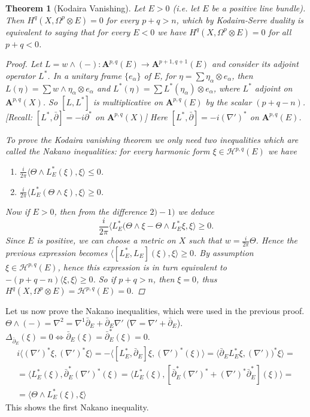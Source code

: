 \documentclass[12pt]{article}
\theoremstyle{darkgreentheorem}
\newtheorem{thm}{Theorem}[section]
\theoremstyle{darkbluedefinition}
\theoremstyle{darkredexample}
\theoremstyle{remark}
\newcommand{\1}{\mathbbm{1}}
\newcommand{\A}{\mathbf{A}}
\renewcommand{\H}{\mathcal{H}}
\newcommand{\ot}{\otimes}
\begin{document}
\begin{thm}[Kodaira Vanishing]
    Let $E>0$ (i.e. let $E$ be a positive line bundle).
    Then $H^{q}(X,\Omega^{p}\ot E)=0$ for every $p+q>n$, which by Kodaira-Serre duality is equivalent to saying that for every $E<0$ we have $H^{q}(X,\Omega^{p}\ot E)=0$ for all $p+q<0$.
    \begin{proof}
	Let $L=w\wedge (-)\colon \A^{p,q}(E)\to \A^{p+1,q+1}(E)$ and consider its adjoint operator $L^{*}$.
	In a unitary frame $\{e_{\alpha}\}$ of $E$, for $\eta=\sum \eta_{\alpha}\ot e_{\alpha}$, then $L(\eta)=\sum w\wedge \eta_{\alpha}\ot e_{\alpha}$ and $L^{*}(\eta)=\sum L^{*}(\eta_{\alpha})\ot e_{\alpha}$, where $L^{*}$ adjoint on $\A^{p,q}(X)$.
	So $[L,L^{*}]$ is multiplicative on $\A^{p,q}(E)$ by the scalar $(p+q-n)$.
	[Recall: $[L^{*},\bar{\partial}]=-i\partial^{*}$ on $\A^{p,q}(X)$]
	Here $[L^{*},\bar{\partial}]=-i(\nabla')^{*}$ on $\A^{p,q}(E)$.

	To prove the Kodaira vanishing theorem we only need two inequalities which are called the \textit{Nakano inequalities}: for every harmonic form $\xi \in \H^{p,q}(E)$ we have
	\begin{enumerate}[label=\arabic*)]
	    \item $\frac{i}{2\pi} \langle \Theta \wedge L_{E}^{*}(\xi), \xi\rangle \leqslant 0$.
	    \item $\frac{i}{2\pi} \langle L_{E}^{*}(\Theta \wedge \xi),\xi\rangle \geqslant 0$.
	\end{enumerate}

	Now if $E>0$, then from the difference $2)-1)$ we deduce
	\[ \frac{i}{2\pi}\langle L_{E}^{*}(\Theta \wedge \xi -\Theta \wedge L_{E}^{*}\xi ,\xi\rangle \geqslant 0 .\]
	Since $E$ is positive, we can choose a metric on $X$ such that $w=\frac{i}{2\pi}\Theta$.
	Hence the previous expression becomes $\langle [L_{E}^{*},L_{E}](\xi),\xi\rangle \geqslant 0$.
	By assumption $\xi\in \H^{p,q}(E)$, hence this expression is in turn equivalent to $-(p+q-n)\langle \xi ,\xi\rangle \geqslant 0 $.
	So if $p+q>n$, then $\xi=0$, thus $H^{q}(X,\Omega^{p}\ot E)=\H^{p,q}(E)=0$.
    \end{proof}
\end{thm}

Let us now prove the Nakano inequalities, which were used in the previous proof.
$\Theta \wedge (-)=\nabla^{2}=\nabla^{1}\bar{\partial}_{E}+\bar{\partial}_{E}\nabla'$ ($\nabla=\nabla'+\bar{\partial}_{E}$).
$\Delta_{\bar{\partial}_{E}}(\xi)=0 \Leftrightarrow \bar{\partial }_{E}(\xi)=\bar{\partial}_{E}^{*}(\xi)=0$.
\begin{multline*}
    i\langle (\nabla')^{*}\xi,(\nabla')^{*}\xi\rangle=-\langle [L_{E}^{*},\bar{\partial}_{E}]\xi,(\nabla')^{*}(\xi)\rangle = \langle \bar{\partial}_{E} L_{E}^{*}\xi,(\nabla'))^{*}\xi\rangle =\\
    =\langle L_{E}^{*}(\xi),\bar{\partial}_{E}^{*}(\nabla')^{*}(\xi)=\langle L_{E}^{*}(\xi),[\bar{\partial}_{E}^{*}(\nabla')^{*}+(\nabla')^{*}\bar{\partial}_{E}^{*}](\xi)\rangle = \\
    =\langle \Theta \wedge L_{E}^{*}(\xi),\xi\rangle 
\end{multline*}
This shows the first Nakano inequality.
\end{document}
